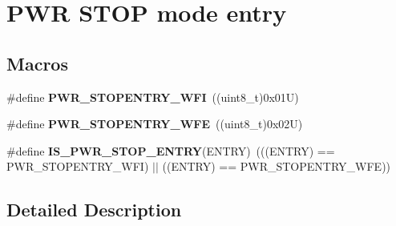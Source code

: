 \hypertarget{group___p_w_r___s_t_o_p__mode__entry}{}\section{P\+WR S\+T\+OP mode entry}
\label{group___p_w_r___s_t_o_p__mode__entry}
\subsection*{Macros}
\begin{DoxyCompactItemize}
\item 
\mbox{\label{group___p_w_r___s_t_o_p__mode__entry_ga3bdb1a9c9b421b73ab148d45eb90fa9b}} 
\#define {\bfseries P\+W\+R\+\_\+\+S\+T\+O\+P\+E\+N\+T\+R\+Y\+\_\+\+W\+FI}~((uint8\+\_\+t)0x01\+U)
\item 
\mbox{\label{group___p_w_r___s_t_o_p__mode__entry_ga2e1ee5c9577cc322474a826fa97de798}} 
\#define {\bfseries P\+W\+R\+\_\+\+S\+T\+O\+P\+E\+N\+T\+R\+Y\+\_\+\+W\+FE}~((uint8\+\_\+t)0x02\+U)
\item 
\mbox{\label{group___p_w_r___s_t_o_p__mode__entry_ga4a94eb1f400dec6e486fbc229cbea8a0}} 
\#define {\bfseries I\+S\+\_\+\+P\+W\+R\+\_\+\+S\+T\+O\+P\+\_\+\+E\+N\+T\+RY}(E\+N\+T\+RY)~(((E\+N\+T\+RY) == P\+W\+R\+\_\+\+S\+T\+O\+P\+E\+N\+T\+R\+Y\+\_\+\+W\+FI) $\vert$$\vert$ ((E\+N\+T\+RY) == P\+W\+R\+\_\+\+S\+T\+O\+P\+E\+N\+T\+R\+Y\+\_\+\+W\+FE))
\end{DoxyCompactItemize}


\subsection{Detailed Description}
